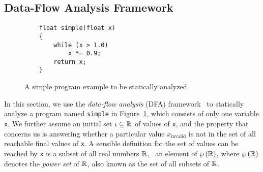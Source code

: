 \subsection{Data-Flow Analysis Framework}
\label{bg:sub:data_flow}

\begin{figure}[ht]
    \centering
    \begin{minipage}{0.5\textwidth}
    \begin{lstlisting}
    float simple(float x)
    {
        while (x > 1.0)
            x *= 0.9;
        return x;
    }
    \end{lstlisting}
    \end{minipage}
    \caption{%
        A simple program example to be statically analyzed.
    }\label{bg:lst:simple}
\end{figure}
In this section, we use the \emph{data-flow analysis} (DFA)
framework~\cite{nielson99} to statically analyze a program named \verb|simple|
in Figure~\ref{bg:lst:simple}, which consists of only one variable \verb|x|.
We further assume an initial set $\iota \subseteq \mathbb{R}$ of values of
\verb|x|, and the property that concerns us is answering whether a particular
value $x_\mathrm{invalid}$ is not in the set of all reachable final values
of \verb|x|.  A sensible definition for the set of values can be reached
by \verb|x| is a subset of all real numbers $\mathbb{R}$, \ie~an element of
$\wp\left({\mathbb{R}}\right)$, where $\wp\left({\mathbb{R}}\right)$ denotes the \emph{power set}
of $\mathbb{R}$, also known as the set of all subsets of $\mathbb{R}$.

